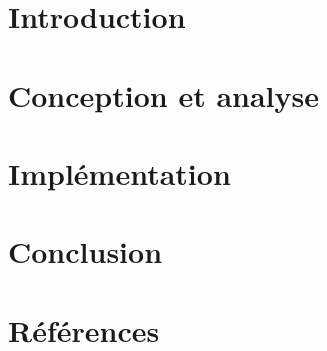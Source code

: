\documentclass[a4paper, 12pt]{article}
\begin{document}
\section{Introduction} %

\newpage

\section{Conception et analyse} %

\newpage

\section{Implémentation} %

\newpage

\section{Conclusion} %

\newpage

\section{Références} %


\end{document}
